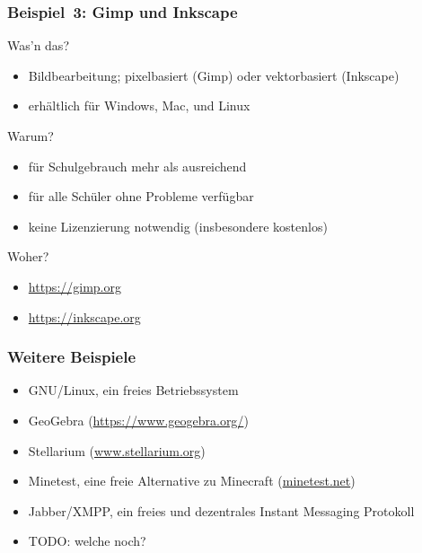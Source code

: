 \documentclass{beamer}
\begin{document}
\begin{frame}
  \frametitle{Beispiel~3: Gimp und Inkscape}

  \onslide<+->

  \begin{block}{Was'n das?}
    \begin{itemize}
    \item Bildbearbeitung; pixelbasiert (Gimp) oder vektorbasiert (Inkscape)
    \item erhältlich für Windows, Mac, und Linux
    \end{itemize}
  \end{block}

  \onslide<+->

  \begin{block}{Warum?}
    \begin{itemize}
    \item für Schulgebrauch mehr als ausreichend
    \item für alle Schüler ohne Probleme verfügbar
    \item keine Lizenzierung notwendig (insbesondere kostenlos)
    \end{itemize}
  \end{block}

  \onslide<+->

  \begin{block}{Woher?}
    \begin{itemize}
    \item \url{https://gimp.org}
    \item \url{https://inkscape.org}
    \end{itemize}
  \end{block}


\end{frame}

\begin{frame}
  \frametitle{Weitere Beispiele}

  \onslide<+->

  \begin{itemize}
  \item GNU/Linux, ein freies Betriebssystem %
  \item GeoGebra (\url{https://www.geogebra.org/})
  \item Stellarium (\url{www.stellarium.org})
  \item Minetest, eine freie Alternative zu Minecraft (\url{minetest.net})
  \item Jabber/XMPP, ein freies und dezentrales Instant Messaging Protokoll
  \item TODO: welche noch? %
  \end{itemize}

\end{frame}
\end{document}

